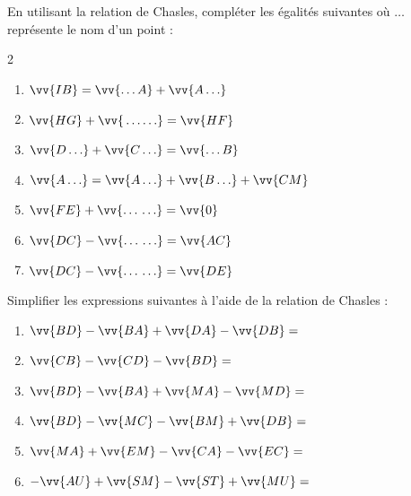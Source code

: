 \documentclass[main.tex]{subfiles}
\begin{document}
\begin{exercise}\label{chap07.exo.chasles02}   \hfill 

\noindent
En utilisant la relation de Chasles, compléter les égalités suivantes où \og $\ldots$\fg{}  représente le nom d'un point :
\begin{multicols}{2} 
\begin{enumerate}[label=\alph*),leftmargin=*]
\item\rule{0pt}{1.8em} $\vv{IB}=\vv{\ldots A}+\vv{A\ldots}$
\item\rule{0pt}{1.8em} $\vv{HG}+\vv{\rule[1em]{0cm}{0pt} \ldots\ldots}= \vv{HF}$ 
\item\rule{0pt}{1.8em} $\vv{D\ldots}+\vv{C\ldots}=\vv{\ldots B}$
\item\rule{0pt}{1.8em} $\vv{A\ldots}=\vv{A\ldots}+\vv{B\ldots}+\vv{CM}$
\item\rule{0pt}{1.8em} $\vv{FE}+\vv{\ldots\rule[1em]{0cm}{0pt}\ldots}=\vv{0}$ 

\item\rule{0pt}{1.8em} $\vv{DC} - \vv{\ldots\rule[1em]{0cm}{0pt} \ldots}=\vv{AC}$
\item\rule{0pt}{1.8em} $\vv{DC} - \vv{\ldots\rule[1em]{0cm}{0pt} \ldots}=\vv{DE}$ 
\end{enumerate}
\end{multicols}
\end{exercise}
\begin{exercise}\label{chap07.exo.chasles03} \hfill 

\noindent	Simplifier les expressions suivantes à l'aide de la relation de Chasles :
\begin{enumerate} [label=\alph*)] 
\item\rule{0pt}{1.8em} $\vv{BD}-\vv{BA}+\vv{DA}-\vv{DB}=$
\item\rule{0pt}{1.8em} $\vv{CB}-\vv{CD}-\vv{BD}=$
\item\rule{0pt}{1.8em} $\vv{BD}-\vv{BA}+\vv{MA}-\vv{MD}=$
\item\rule{0pt}{1.8em} $\vv{BD}-\vv{MC}-\vv{BM}+\vv{DB}=$
\item\rule{0pt}{1.8em} $\vv{MA}+\vv{EM}-\vv{CA}-\vv{EC}=$
\item\rule{0pt}{1.8em} $-\vv{AU}+\vv{SM}-\vv{ST}+\vv{MU}=$
\end{enumerate}
\end{exercise}
\end{document}
